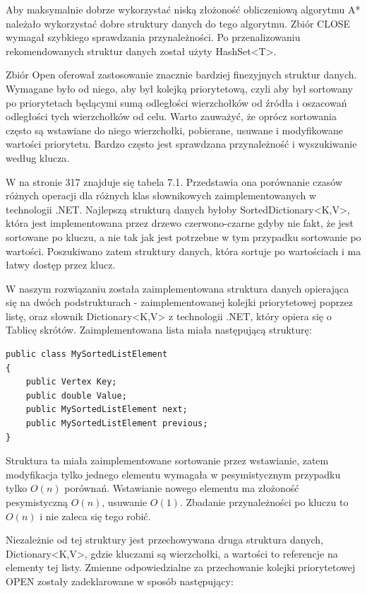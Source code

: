 \documentclass[a4paper,11pt,twoside,openright]{report}
\theoremstyle{definition}
\begin{document}
Aby maksymalnie dobrze wykorzystać niską złożoność obliczeniową algorytmu A*
należało wykorzystać dobre struktury danych do tego algorytmu. Zbiór CLOSE
wymagał szybkiego sprawdzania przynależności. Po przenalizowaniu rekomendowanych
struktur danych \cite{Dotnet struktury} został użyty HashSet<T>.

Zbiór Open oferował zastosowanie znacznie bardziej finezyjnych struktur danych.
Wymagane było od niego, aby był kolejką priorytetową, czyli aby był sortowany po
priorytetach będącymi sumą odległości wierzchołków od źródła i oszacowań odległości
tych wierzchołków od celu. Warto zauważyć, że oprócz sortowania często są wstawiane
do niego wierzchołki, pobierane, usuwane i modyfikowane wartości priorytetu.
Bardzo często jest sprawdzana przynależność i wyszukiwanie według klucza.

W \cite{C w pigulce} na stronie 317 znajduje się tabela 7.1. Przedstawia ona
porównanie czasów różnych operacji dla różnych klas słownikowych zaimplementowanych
w technologii .NET. Najlepszą strukturą danych byłoby SortedDictionary<K,V>,
która jest implementowana przez drzewo czerwono-czarne gdyby nie fakt, że jest
sortowane po kluczu, a nie tak jak jest potrzebne w tym przypadku sortowanie
po wartości. Poszukiwano zatem struktury danych, która sortuje po wartościach
i ma łatwy dostęp przez klucz.

W naszym rozwiązaniu została zaimplementowana struktura danych opierająca się
na dwóch podstrukturach - zaimplementowanej kolejki priorytetowej poprzez listę,
oraz słownik Dictionary<K,V> z technologii .NET, który opiera się o Tablicę
skrótów. Zaimplementowana lista miała następującą strukturę:

\begin{verbatim}
public class MySortedListElement
{
    public Vertex Key;
    public double Value;
    public MySortedListElement next;
    public MySortedListElement previous;
}
\end{verbatim}

Struktura ta miała zaimplementowane sortowanie przez wstawianie, zatem modyfikacja
tylko jednego elementu wymagała w pesymistycznym przypadku tylko $O(n)$ porównań.
Wstawianie nowego elementu ma złożoność pesymistyczną $O(n)$, usuwanie $O(1)$.
Zbadanie przynależności po kluczu to $O(n)$ i nie zaleca się tego robić.

Niezależnie od tej struktury jest przechowywana druga struktura danych,
Dictionary<K,V>, gdzie kluczami są wierzchołki, a wartości to referencje na
elementy tej listy. Zmienne odpowiedzialne za przechowanie kolejki priorytetowej
OPEN zostały zadeklarowane w sposób następujący:
\end{document}
